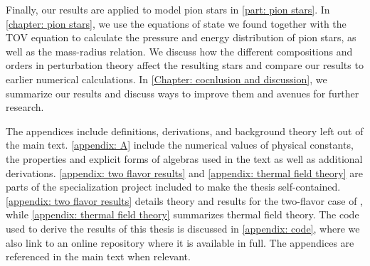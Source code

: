 Finally, our results are applied to model pion stars in \autoref{part: pion stars}.
In \autoref{chapter: pion stars}, we use the equations of state we found together with the TOV equation to calculate the pressure and energy distribution of pion stars, as well as the mass-radius relation.
We discuss how the different compositions and orders in perturbation theory affect the resulting stars and compare our results to earlier numerical calculations.
In \autoref{Chapter: cocnlusion and discussion}, we summarize our results and discuss ways to improve them and avenues for further research.

The appendices include definitions, derivations, and background theory left out of the main text.
\autoref{appendix: A} include the numerical values of physical constants, the properties and explicit forms of algebras used in the text as well as additional derivations.
\autoref{appendix: two flavor results} and \autoref{appendix: thermal field theory} are parts of the specialization project included to make the thesis self-contained.
\autoref{appendix: two flavor results} details theory and results for the two-flavor case of \chpt, while \autoref{appendix: thermal field theory} summarizes thermal field theory.
The code used to derive the results of this thesis is discussed in \autoref{appendix: code}, where we also link to an online repository where it is available in full.
The appendices are referenced in the main text when relevant.

